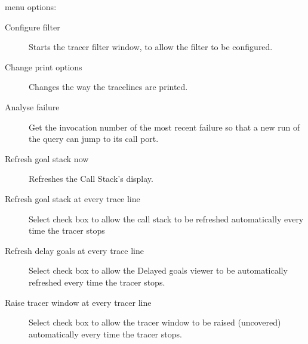 
 menu options:
\begin{small}
\begin{description}
\item[Configure filter] Starts the tracer filter window, to allow the
  filter to be configured.
\item[Change print options] Changes the way the tracelines are printed.
\item[Analyse failure] Get the invocation number of the most recent failure
  so that a new run of the  query can jump to its call port.
\item[Refresh goal stack now] Refreshes the Call Stack's display.
\item[Refresh goal stack at every trace line] Select check box to allow the
  call stack to be refreshed automatically every time the tracer stops
\item[Refresh delay goals at every trace line] Select check box to allow
  the Delayed goals viewer to be automatically refreshed every time the
  tracer stops.
\item[Raise tracer window at every tracer line] Select check box to allow
  the tracer window to be raised (uncovered) automatically every time the
  tracer stops.
\end{description}
\end{small}

